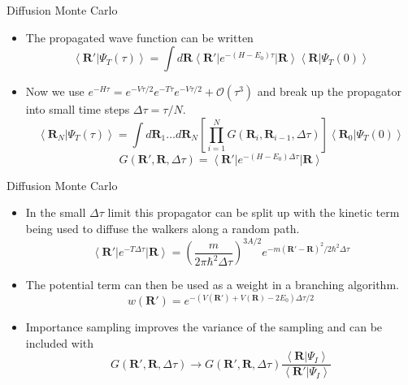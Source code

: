 \documentclass{beamer}
\newcommand{\ket}[1]{\left| #1 \right>}
\newcommand{\bra}[1]{\left< #1 \right|}
\newcommand{\braket}[2]{\left< #1 | #2 \right>}
\newcommand{\R}{\mathbf{R}}
\newcommand{\dt}{\Delta\tau}
\begin{document}
\begin{frame}{Diffusion Monte Carlo}
\begin{itemize}
   \item The propagated wave function can be written
   \begin{equation*}
      \braket{\R'}{\Psi_T(\tau)} = \int d\R \bra{\R'}e^{-(H-E_0)\tau}\ket{\R}\braket{\R}{\Psi_T(0)}
   \end{equation*}
   \item Now we use $e^{-H\tau}=e^{-V\tau/2}e^{-T\tau}e^{-V\tau/2}+\mathcal{O}(\tau^3)$ and break up the propagator into small time steps $\dt = \tau/N$.
   \begin{equation*}
      \braket{\R_N}{\Psi_T(\tau)} = \int d\R_1 \ldots d\R_N \left[\prod\limits_{i=1}^N G(\R_i,\R_{i-1},\Delta\tau)\right] \braket{\R_0}{\Psi_T(0)}
   \end{equation*}
   \begin{equation*}
      G(\R',\R,\Delta\tau) = \bra{\R'}e^{-(H-E_0)\Delta\tau}\ket{\R}
   \end{equation*}
\end{itemize}
\end{frame}

\begin{frame}{Diffusion Monte Carlo}
\begin{itemize}
   \item In the small $\dt$ limit this propagator can be split up with the kinetic term being used to diffuse the walkers along a random path.
   \begin{equation*}
      \bra{\R'}e^{-T\Delta \tau}\ket{\R} = \left(\frac{m}{2\pi\hbar^2\Delta\tau}\right)^{3A/2}e^{-m(\R'-\R)^2/2\hbar^2\Delta\tau}
   \end{equation*}
   \item The potential term can then be used as a weight in a branching algorithm.
   \begin{equation*}
      w(\R') = e^{-\left(V\left(\R'\right)+V\left(\R\right)-2E_0\right)\Delta\tau/2}%
   \end{equation*}
   \item Importance sampling improves the variance of the sampling and can be included with
   \begin{equation*}
      G(\R',\R,\Delta\tau) \rightarrow G(\R',\R,\Delta\tau)\frac{\braket{\R}{\Psi_I}}{\braket{\R'}{\Psi_I}}
   \end{equation*}
\end{itemize}
\end{frame}
\end{document}
